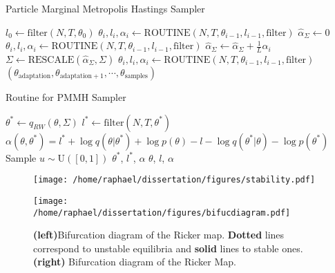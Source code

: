 \documentclass[12pt]{article}
\begin{document}
	\begin{algorithm}
		\caption{Particle Marginal Metropolis Hastings Sampler}\label{pmmh}
		\begin{algorithmic}[1]
			\State $l_0 \gets \text{filter}(N, T, \theta_0)$
			\State $\theta_i, l_i, \alpha_i \gets \text{ROUTINE}(N, T, \theta_{i-1}, l_{i-1}, \text{filter})$
			\EndFor
			\State $\hat{\alpha}_\Sigma \gets 0$
			\State $\theta_i, l_i, \alpha_i \gets \text{ROUTINE}(N, T, \theta_{i-1}, l_{i-1}, \text{filter})$
			\State $\hat{\alpha}_\Sigma \gets \hat{\alpha}_\Sigma + \frac{1}{L}\alpha_i$
			\EndFor
			\State $\Sigma \gets \text{RESCALE}(\hat{\alpha}_\Sigma, \Sigma)$
			\EndFor
			\State $\theta_i, l_i, \alpha_i \gets \text{ROUTINE}(N, T, \theta_{i-1}, l_{i-1}, \text{filter})$
			\EndFor
			\Return $(\theta_{\text{adaptation}},\theta_{\text{adaptation}+1}, \cdots, \theta_{\text{samples}})$
			\EndFunction
		\end{algorithmic}
	\end{algorithm}
	
	\begin{algorithm}
		\caption{Routine for PMMH Sampler}\label{routine}
		\begin{algorithmic}[1]
			\Function{ROUTINE}{N, T, $\theta$, $l$, filter}
			\State $\theta^* \gets q_{RW}(\theta, \Sigma)$
			\State $l^* \gets \text{filter}(N, T, \theta^*)$
			\State $\alpha(\theta, \theta^*) = l^*+\log q(\theta|\theta^*) + \log p(\theta) - l - \log q(\theta^*|\theta) - \log p(\theta^*)$
			\State Sample $u \sim \text{U}([0, 1])$
			\If{$\log u \le \alpha(\theta, \theta^*)$}
			\State \Return $\theta^*$, $l^*$, $\alpha$
			\Else
			\State \Return $\theta$, $l$, $\alpha$
			\EndIf
			\EndFunction
		\end{algorithmic}
	\end{algorithm}
	
	
	\begin{figure}[htb]
		\centering
		\begin{minipage}{0.4\textwidth}
			\centering
			\texttt{[image: /home/raphael/dissertation/figures/stability.pdf]}
		\end{minipage}
		\begin{minipage}{0.4\textwidth}
			\centering
			\texttt{[image: /home/raphael/dissertation/figures/bifucdiagram.pdf]}
		\end{minipage}
		\caption{\textbf{(left)}Bifurcation diagram of the Ricker map. \textbf{Dotted} lines correspond to unstable equilibria and \textbf{solid} lines to stable ones. \textbf{(right)} Bifurcation diagram of the Ricker Map.}
		\label{fig:stability}
	\end{figure}
\end{document}
